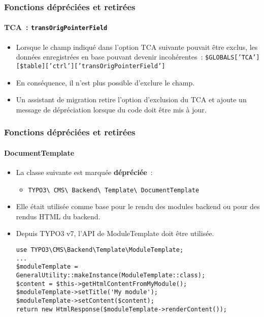 \begin{frame}[fragile]
	\frametitle{Fonctions dépréciées et retirées}
	\framesubtitle{TCA~: \texttt{transOrigPointerField}}

	\begin{itemize}
		\item Lorsque le champ indiqué dans l'option TCA suivante pouvait être exclus,
			les données enregistrées en base pouvant devenir incohérentes~:
			\small
				\texttt{\$GLOBALS['TCA'][\$table]['ctrl']['transOrigPointerField']}
			\normalsize

		\item En conséquence, il n'est plus possible d'exclure le champ.
		\item Un assistant de migration retire l'option d'exclusion du TCA et ajoute
			un message de dépréciation lorsque du code doit être mis à jour.
	\end{itemize}

\end{frame}


\begin{frame}[fragile]
	\frametitle{Fonctions dépréciées et retirées}
	\framesubtitle{DocumentTemplate}

	\lstset{basicstyle=\tiny\ttfamily}

	\begin{itemize}
		\item La classe suivante est marquée \textbf{dépréciée}~:

			\begin{itemize}
				\item \texttt{TYPO3\textbackslash
					CMS\textbackslash
					Backend\textbackslash
					Template\textbackslash
					DocumentTemplate}
			\end{itemize}

		\item Elle était utilisée comme base pour le rendu des modules backend ou pour des rendus HTML du backend.
		\item Depuis TYPO3 v7, l'API de ModuleTemplate doit être utilisée.

\vspace{-0.4cm}
\begin{lstlisting}
use TYPO3\CMS\Backend\Template\ModuleTemplate;
...
$moduleTemplate = GeneralUtility::makeInstance(ModuleTemplate::class);
$content = $this->getHtmlContentFromMyModule();
$moduleTemplate->setTitle('My module');
$moduleTemplate->setContent($content);
return new HtmlResponse($moduleTemplate->renderContent());
\end{lstlisting}

	\end{itemize}

\end{frame}

